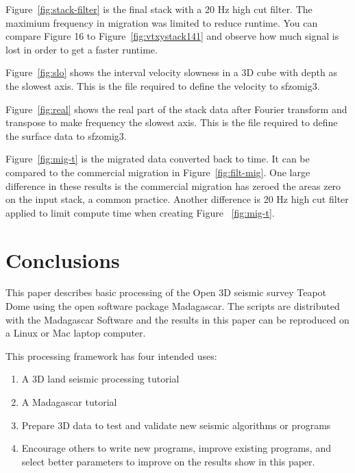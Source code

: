 Figure~\ref{fig:stack-filter} is the final stack with a 20 Hz high cut filter.  The maximium frequency in migration was limited to reduce runtime.  You can compare Figure 16 to Figure~\ref{fig:vtxystack141} and observe how much signal is lost in order to get a faster runtime.

Figure~\ref{fig:slo} shows the interval velocity slowness in a 3D cube with depth as the slowest axis.  This is the file required to define the velocity to sfzomig3.

Figure~\ref{fig:real} shows the real part of the stack data after Fourier transform and transpose to make frequency the slowest axis.  This is the file required to define the surface data to sfzomig3.

Figure~\ref{fig:mig-t} is the migrated data converted back to time.  It can be compared to the commercial migration in Figure~\ref{fig:filt-mig}.  One large difference in these results is the commercial migration has zeroed the areas zero on the input stack, a common practice.  Another difference is 20 Hz high cut filter applied to limit compute time when creating Figure ~\ref{fig:mig-t}.  






\section{Conclusions}
This paper describes basic processing of the Open 3D seismic survey Teapot Dome using the open software package Madagascar.   The scripts are distributed with the Madagascar Software and the results in this paper can be reproduced on a Linux or Mac laptop computer.  

This processing framework has four intended uses:
\begin{enumerate}
\item A 3D land seismic processing tutorial
\item A Madagascar tutorial
\item Prepare 3D data to test and validate new seismic algorithms or programs
\item Encourage others to write new programs, improve existing programs, and select better parameters to improve on the results show in this paper.
\end{enumerate}

